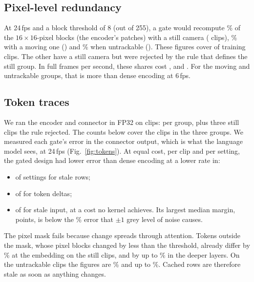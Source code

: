\documentclass[conference]{IEEEtran}
\begin{document}
\subsection{Pixel-level redundancy}
At 24\,fps and a block threshold of 8 (out of 255), a gate would recompute \XzeroStillKeep\% of the
$16\times16$-pixel blocks (the encoder's patches) with a still camera (\XzeroStillClips{} clips),
\XzeroMovingKeep\% with a moving one (\XzeroMovingClips) and \XzeroUntrackKeep\% when untrackable
(\XzeroUntrackClips). These figures cover \XzeroGrouped{} of \XzeroClips{} training clips. The other \XzeroRejected{} have a still camera but were
rejected by the rule that defines the still group. In full frames per second, these shares cost
\XzeroStillCost, \XzeroMovingCost{} and \XzeroUntrackCost. For the moving and untrackable groups, that is more
than dense encoding at 6\,fps.

\subsection{Token traces}
We ran the encoder and connector in FP32 on \TokClips{} clips: \TokPerGroup{} per group, plus three still clips
the rule rejected. The counts below cover the \TokGrouped{} clips in the three groups. We measured each gate's error in the connector output, which is what the language model sees,
at 24\,fps (Fig.~\ref{fig:tokens}). At equal cost, per clip and per setting, the gated design had lower error
than dense encoding at a lower rate in:
\begin{itemize}
\item \TierBLower{} of \TierBSettings{} settings for stale rows;
\item \TierCLower{} of \TierCSettings{} for token deltas;
\item \TierALower{} of \TierASettings{} for stale input, at a cost no kernel achieves. Its largest median
margin, \TierAMaxMargin{} points, is below the \NoiseFloorPct\% error that $\pm1$ grey level of noise causes.
\end{itemize}

The pixel mask fails because change spreads through attention. Tokens outside the mask, whose pixel blocks
changed by less than the threshold, already differ by \TrStillOutEmb\% at the embedding on the still clips, and by up to \TrStillOutDeep\%
in the deeper layers. On the untrackable clips the figures are \TrUntrackOutEmb\% and up to
\TrUntrackOutDeep\%. Cached rows are therefore stale as soon as anything changes.
\end{document}
